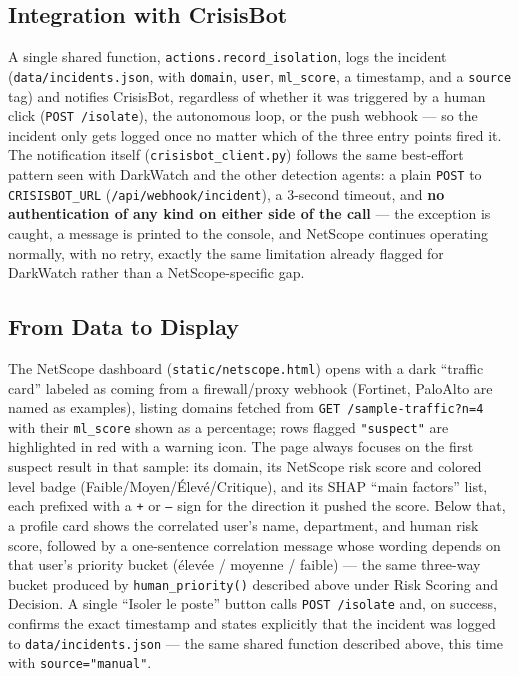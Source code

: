 \subsection*{Integration with CrisisBot}
A single shared function, \texttt{actions.record\_isolation}, logs the
incident (\texttt{data/incidents.json}, with \texttt{domain}, \texttt{user},
\texttt{ml\_score}, a timestamp, and a \texttt{source} tag) and notifies
CrisisBot, regardless of whether it was triggered by a human click
(\texttt{POST /isolate}), the autonomous loop, or the push webhook --- so
the incident only gets logged once no matter which of the three entry
points fired it. The notification itself (\texttt{crisisbot\_client.py})
follows the same best-effort pattern seen with DarkWatch and the other
detection agents: a plain \texttt{POST} to \texttt{CRISISBOT\_URL}
(\texttt{/api/webhook/incident}), a 3-second timeout, and \textbf{no
authentication of any kind on either side of the call} --- the exception is
caught, a message is printed to the console, and NetScope continues
operating normally, with no retry, exactly the same limitation already
flagged for DarkWatch rather than a NetScope-specific gap.

\subsection*{From Data to Display}
The NetScope dashboard (\texttt{static/netscope.html}) opens with a dark
``traffic card'' labeled as coming from a firewall/proxy webhook
(Fortinet, PaloAlto are named as examples), listing domains fetched from
\texttt{GET /sample-traffic?n=4} with their \texttt{ml\_score} shown as a
percentage; rows flagged \texttt{"suspect"} are highlighted in red with a
warning icon. The page always focuses on the first suspect result in that
sample: its domain, its NetScope risk score and colored level badge
(Faible/Moyen/Élevé/Critique), and its SHAP ``main factors'' list, each
prefixed with a \texttt{+} or \texttt{--} sign for the direction it pushed
the score. Below that, a profile card shows the correlated user's name,
department, and human risk score, followed by a one-sentence
correlation message whose wording depends on that user's priority bucket
(élevée / moyenne / faible) --- the same three-way bucket produced by
\texttt{human\_priority()} described above under Risk Scoring and
Decision. A single
``Isoler le poste'' button calls \texttt{POST /isolate} and, on success,
confirms the exact timestamp and states explicitly that the incident was
logged to \texttt{data/incidents.json} --- the same shared function
described above, this time with \texttt{source="manual"}.

